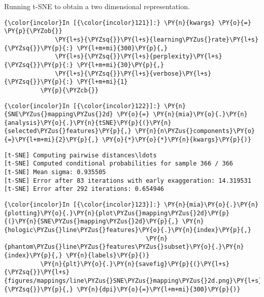 Running t-SNE to obtain a two dimensional representation.

    \begin{Verbatim}[commandchars=\\\{\}]
{\color{incolor}In [{\color{incolor}121}]:} \PY{n}{kwargs} \PY{o}{=} \PY{p}{\PYZob{}}
              \PY{l+s}{\PYZsq{}}\PY{l+s}{learning\PYZus{}rate}\PY{l+s}{\PYZsq{}}\PY{p}{:} \PY{l+m+mi}{300}\PY{p}{,}
              \PY{l+s}{\PYZsq{}}\PY{l+s}{perplexity}\PY{l+s}{\PYZsq{}}\PY{p}{:} \PY{l+m+mi}{30}\PY{p}{,}
              \PY{l+s}{\PYZsq{}}\PY{l+s}{verbose}\PY{l+s}{\PYZsq{}}\PY{p}{:} \PY{l+m+mi}{1}
          \PY{p}{\PYZcb{}}
\end{Verbatim}

    \begin{Verbatim}[commandchars=\\\{\}]
{\color{incolor}In [{\color{incolor}122}]:} \PY{n}{SNE\PYZus{}mapping\PYZus{}2d} \PY{o}{=} \PY{n}{mia}\PY{o}{.}\PY{n}{analysis}\PY{o}{.}\PY{n}{tSNE}\PY{p}{(}\PY{n}{selected\PYZus{}features}\PY{p}{,} \PY{n}{n\PYZus{}components}\PY{o}{=}\PY{l+m+mi}{2}\PY{p}{,} \PY{o}{*}\PY{o}{*}\PY{n}{kwargs}\PY{p}{)}
\end{Verbatim}

    \begin{Verbatim}[commandchars=\\\{\}]
[t-SNE] Computing pairwise distances\ldots
[t-SNE] Computed conditional probabilities for sample 366 / 366
[t-SNE] Mean sigma: 0.935505
[t-SNE] Error after 83 iterations with early exaggeration: 14.319531
[t-SNE] Error after 292 iterations: 0.654946
    \end{Verbatim}

    \begin{Verbatim}[commandchars=\\\{\}]
{\color{incolor}In [{\color{incolor}123}]:} \PY{n}{mia}\PY{o}{.}\PY{n}{plotting}\PY{o}{.}\PY{n}{plot\PYZus{}mapping\PYZus{}2d}\PY{p}{(}\PY{n}{SNE\PYZus{}mapping\PYZus{}2d}\PY{p}{,} \PY{n}{hologic\PYZus{}line\PYZus{}features}\PY{o}{.}\PY{n}{index}\PY{p}{,}
                                       \PY{n}{phantom\PYZus{}line\PYZus{}features\PYZus{}subset}\PY{o}{.}\PY{n}{index}\PY{p}{,} \PY{n}{labels}\PY{p}{)}
          \PY{n}{plt}\PY{o}{.}\PY{n}{savefig}\PY{p}{(}\PY{l+s}{\PYZsq{}}\PY{l+s}{figures/mappings/line\PYZus{}SNE\PYZus{}mapping\PYZus{}2d.png}\PY{l+s}{\PYZsq{}}\PY{p}{,} \PY{n}{dpi}\PY{o}{=}\PY{l+m+mi}{300}\PY{p}{)}
\end{Verbatim}

    \begin{center}
    \end{center}
    { \hspace*{\fill} \\}

